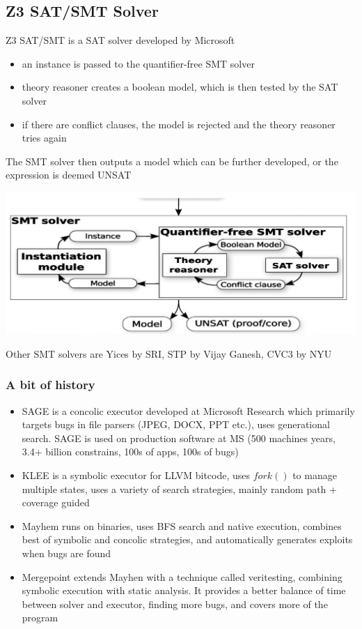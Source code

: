 \documentclass[11pt, oneside]{article}   	%
\begin{document}
\subsection*{Z3 SAT/SMT Solver}
Z3 SAT/SMT is a SAT solver developed by Microsoft
\begin{itemize}
\item an instance is passed to the quantifier-free SMT solver
\item theory reasoner creates a boolean model, which is then tested by the SAT solver
\item if there are conflict clauses, the model is rejected and the theory reasoner tries again
\end{itemize}
The SMT solver then outputs a model which can be further developed, or the expression is deemed UNSAT
\begin{center}
\includegraphics[scale = 0.4]{theory}
\end{center}
Other SMT solvers are Yices by SRI, STP by Vijay Ganesh, CVC3 by NYU
\subsubsection*{A bit of history}
\begin{itemize}
\item SAGE is a concolic executor developed at Microsoft Research which primarily targets bugs in file parsers (JPEG, DOCX, PPT etc.), uses generational search. SAGE is used on production software at MS (500 machines years, 3.4+ billion constrains, 100s of apps, 100s of bugs)
\item KLEE is a symbolic executor for LLVM bitcode, uses $fork()$ to manage multiple states, uses a variety of search strategies, mainly random path + coverage guided
\item Mayhem runs on binaries, uses BFS search and native execution, combines best of symbolic and concolic strategies, and automatically generates exploits when bugs are found
\item Mergepoint extends Mayhen with a technique called veritesting, combining symbolic execution with static analysis. It provides a better balance of time between solver and executor, finding more bugs, and covers more of the program
\end{itemize}
\end{document}
